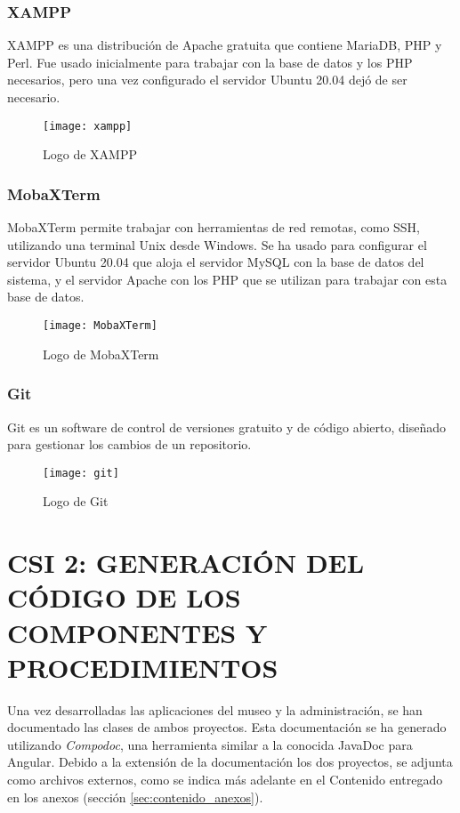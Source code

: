 \subsubsection{XAMPP}
XAMPP es una distribución de Apache gratuita que contiene MariaDB, PHP y Perl\cite{Xampp}. Fue usado inicialmente para trabajar con la base de datos y los PHP necesarios, pero una vez configurado el servidor Ubuntu 20.04 dejó de ser necesario.
\begin{figure}[H]
	\centering
	\texttt{[image: xampp]}
	\caption{Logo de XAMPP}
\end{figure}
\subsubsection{MobaXTerm}
MobaXTerm permite trabajar con herramientas de red remotas, como SSH, utilizando una terminal Unix desde Windows. Se ha usado para configurar el servidor Ubuntu 20.04 que aloja el servidor MySQL con la base de datos del sistema, y el servidor Apache con los PHP que se utilizan para trabajar con esta base de datos.
\begin{figure}[H]
	\centering
	\texttt{[image: MobaXTerm]}
	\caption{Logo de MobaXTerm}
\end{figure}

\subsubsection{Git}
Git es un software de control de versiones gratuito y de código abierto, diseñado para gestionar los cambios de un repositorio\cite{Git}.
\begin{figure}[H]
	\centering
	\texttt{[image: git]}
	\caption{Logo de Git}
\end{figure}

\newpage
\section[CSI 2: GENERACIÓN DEL CÓDIGO DE LOS COMPONENTES Y \\ PROCEDIMIENTOS]{CSI 2: GENERACIÓN DEL CÓDIGO DE LOS COMPONENTES Y PROCEDIMIENTOS}
Una vez desarrolladas las aplicaciones del museo y la administración, se han documentado las clases de ambos proyectos. Esta documentación se ha generado utilizando \textit{Compodoc}\cite{compodoc}, una herramienta similar a la conocida JavaDoc para Angular. Debido a la extensión de la documentación los dos proyectos, se adjunta como archivos externos, como se indica más adelante en el Contenido entregado en los anexos (sección \ref{sec:contenido_anexos}).


